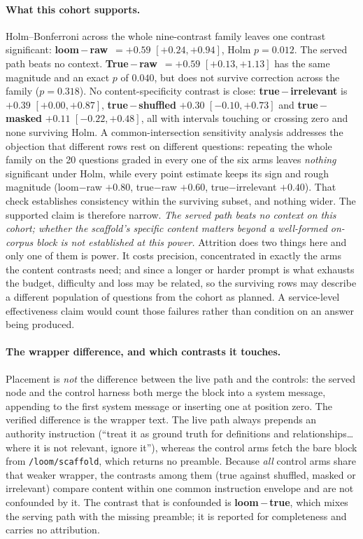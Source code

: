\documentclass[10pt,twocolumn]{article}
\begin{document}
\paragraph{What this cohort supports.} Holm--Bonferroni across the whole nine-contrast family leaves one contrast significant: \textbf{loom\,$-$\,raw}~$=+0.59$ $[+0.24,+0.94]$, Holm $p=0.012$. The served path beats no context. \textbf{True\,$-$\,raw}~$=+0.59$ $[+0.13,+1.13]$ has the same magnitude and an exact $p$ of $0.040$, but does not survive correction across the family ($p=0.318$). No content-specificity contrast is close: \textbf{true\,$-$\,irrelevant} is $+0.39$ $[+0.00,+0.87]$, \textbf{true\,$-$\,shuffled} $+0.30$ $[-0.10,+0.73]$ and \textbf{true\,$-$\,masked} $+0.11$ $[-0.22,+0.48]$, all with intervals touching or crossing zero and none surviving Holm. A common-intersection sensitivity analysis addresses the objection that different rows rest on different questions: repeating the whole family on the 20 questions graded in every one of the six arms leaves \emph{nothing} significant under Holm, while every point estimate keeps its sign and rough magnitude (loom$-$raw $+0.80$, true$-$raw $+0.60$, true$-$irrelevant $+0.40$). That check establishes consistency within the surviving subset, and nothing wider. The supported claim is therefore narrow. \emph{The served path beats no context on this cohort; whether the scaffold's specific content matters beyond a well-formed on-corpus block is not established at this power.} Attrition does two things here and only one of them is power. It costs precision, concentrated in exactly the arms the content contrasts need; and since a longer or harder prompt is what exhausts the budget, difficulty and loss may be related, so the surviving rows may describe a different population of questions from the cohort as planned. A service-level effectiveness claim would count those failures rather than condition on an answer being produced.

\paragraph{The wrapper difference, and which contrasts it touches.} Placement is \emph{not} the difference between the live path and the controls: the served node and the control harness both merge the block into a system message, appending to the first system message or inserting one at position zero. The verified difference is the wrapper text. The live path always prepends an authority instruction (``treat it as ground truth for definitions and relationships\ldots where it is not relevant, ignore it''), whereas the control arms fetch the bare block from \texttt{/loom/scaffold}, which returns no preamble. Because \emph{all} control arms share that weaker wrapper, the contrasts among them (true against shuffled, masked or irrelevant) compare content within one common instruction envelope and are not confounded by it. The contrast that is confounded is \textbf{loom\,$-$\,true}, which mixes the serving path with the missing preamble; it is reported for completeness and carries no attribution.
\end{document}
